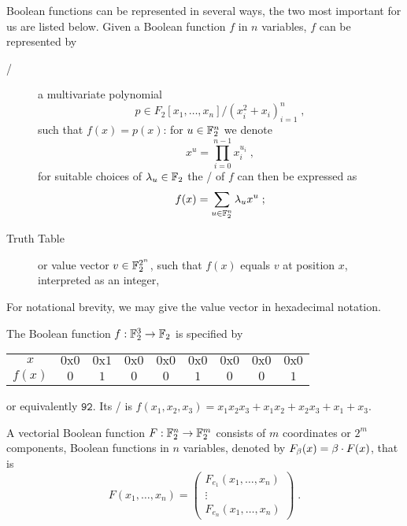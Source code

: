 Boolean functions can be represented in several ways, the two most important for us are listed below.
Given a Boolean function $f$ in $n$ variables, $f$ can be represented by
\begin{description}
    \item[\ANF/] a multivariate polynomial
                 \begin{equation*}
                     p \in F_2[x_1, \ldots, x_n]/(x_i^2 + x_i)_{i=1}^n\;,
                 \end{equation*}
                 such that $f(x) = p(x)$:
                 for $u \in \mathbb{F}_2^n$ we denote
                 \begin{equation*}
                     x^u = \prod_{i=0}^{n-1} x_i^{u_i}\;,
                 \end{equation*}
                 for suitable choices of $\lambda_u \in \mathbb{F}_2$ the \ANF/ of $f$ can then be expressed as
                 \begin{equation*}
                     f(x) = \sum_{u \in \mathbb{F}_2^n} \lambda_u x^u\;;
                 \end{equation*}
    \item[Truth Table] or value vector $v \in \mathbb{F}_2^{2^n}$, such that $f(x)$ equals $v$ at position $x$, interpreted as an integer,
\end{description}
For notational brevity, we may give the value vector in hexadecimal notation.
\begin{example}
    The Boolean function $f : \mathbb{F}_2^3 \to \mathbb{F}_2$ is specified by
    \begin{center}
    \begin{tabular}{ccccccccc}
        \toprule
        $x$ & $\mathrm{0x0}$ & $\mathrm{0x1}$ & $\mathrm{0x0}$ & $\mathrm{0x0}$ & $\mathrm{0x0}$ & $\mathrm{0x0}$ & $\mathrm{0x0}$ & $\mathrm{0x0}$ \\
        $f(x)$ & $0$ & $1$ & $0$ & $0$ & $1$ & $0$ & $0$ & $1$ \\
        \bottomrule
    \end{tabular}
    \end{center}
    or equivalently $\mathtt{92}$.
    Its \ANF/ is $f(x_1, x_2, x_3) = x_1 x_2 x_3 + x_1 x_2 + x_2 x_3 + x_1 + x_3$.
\end{example}
A vectorial Boolean function $F : \mathbb{F}_2^n \to \mathbb{F}_2^m$ consists of $m$ coordinates or $2^m$ components, Boolean functions in $n$ variables, denoted by $F_{\beta}(x) = \beta \cdot F(x)$, that is
\begin{equation*}
    F(x_1, \ldots, x_n) = \begin{pmatrix}
        F_{e_1}(x_1, \ldots, x_n) \\
        \vdots                    \\
        F_{e_n}(x_1, \ldots, x_n)
    \end{pmatrix}\;.
\end{equation*}

